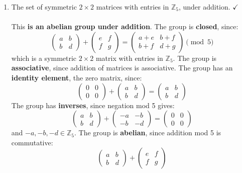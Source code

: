 \documentclass{article}
\newcommand{\Zn}[1]{\mathbb{Z}_{#1}}
\begin{document}
\begin{enumerate}
\begin{enumerate}
            \item The set of symmetric $2 \times 2$ matrices with entries in $\Zn{5}$, under addition. $\checkmark$
            \\
            \\ This \textbf{is an abelian group under addition}. The group is \textbf{closed}, since:
            \[
                \begin{pmatrix} a & b \\ b & d \end{pmatrix} + \begin{pmatrix} e & f \\ f & g \end{pmatrix}
                = \begin{pmatrix} a+e & b+f \\ b+f & d+g \end{pmatrix} \pmod{5}
            \]
            which is a symmetric $2\times 2$ matrix with entries in $\Zn{5}$. The group is \textbf{associative}, since addition of matrices is associative. The group has an \textbf{identity element}, the zero matrix, since:
            \[
                \begin{pmatrix} 0 & 0 \\ 0 & 0 \end{pmatrix} + \begin{pmatrix} a & b \\ b & d \end{pmatrix}
                = \begin{pmatrix} a & b \\ b & d \end{pmatrix}
            \]
            The group has \textbf{inverses}, since negation mod 5 gives:
            \[
                \begin{pmatrix} a & b \\ b & d \end{pmatrix} + \begin{pmatrix} -a & -b \\ -b & -d \end{pmatrix}
                = \begin{pmatrix} 0 & 0 \\ 0 & 0 \end{pmatrix}
            \]
            and $-a,-b,-d \in \Zn{5}$. The group is \textbf{abelian}, since addition mod 5 is commutative:
            \[
                \begin{pmatrix} a & b \\ b & d \end{pmatrix} + \begin{pmatrix} e & f \\ f & g \end{pmatrix}
\]
\end{enumerate}
\end{enumerate}
\end{document}
